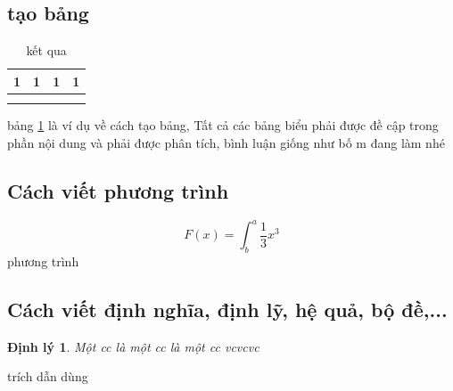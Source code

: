 \documentclass{article}
\newtheorem{theorem}{Định lý}[section]
\begin{document}
\subsection{tạo bảng}
\begin{table}[H]
    \centering
     \caption{kết qua}
    \begin{tabular}{|c|c|c|c|}
    \hline
      1  &  1& 1 &1 \\\hline
        &  &  &\\\hline
        &  &  &\\\hline
      
    \end{tabular}
   
    \label{vailonluon}
\end{table}
bảng \ref{vailonluon} là ví dụ về cách tạo bảng, Tất cả các bảng biểu phải được đề cập trong phần nội dung và phải được phân tích, bình luận giống như bố m đang làm nhé

\subsection{Cách viết phương trình}
\begin{equation} \label{pt31}
    F(x) = \int^a_b \frac{1}{3}x^3
\end{equation}
phương trình

\subsection{Cách viết định nghĩa, định lỹ, hệ quả, bộ đề,...}
\begin{theorem}
    Một cc là một cc là một cc vcvcvc
\end{theorem}
\cleardoublepage

\cleardoublepage
{}


trích dẫn dùng \cite{nani2021antioxidant}

\cleardoublepage
%
\end{document}

